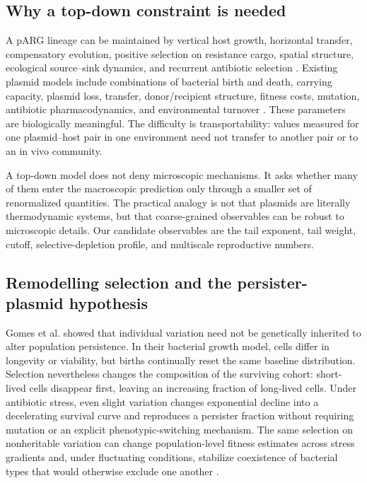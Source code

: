 \documentclass[12pt,a4paper]{article}
\begin{document}
\subsection{Why a top-down constraint is needed}

A pARG lineage can be maintained by vertical host growth, horizontal transfer, compensatory evolution, positive selection on resistance cargo, spatial structure, ecological source--sink dynamics, and recurrent antibiotic selection \citep{harrison2012,brockhurst2022,rodriguezbeltran2021}. Existing plasmid models include combinations of bacterial birth and death, carrying capacity, plasmid loss, transfer, donor/recipient structure, fitness costs, mutation, antibiotic pharmacodynamics, and environmental turnover \citep{hernandez2021,dewan2023,zwanzig2021}. These parameters are biologically meaningful. The difficulty is transportability: values measured for one plasmid--host pair in one environment need not transfer to another pair or to an in vivo community.

A top-down model does not deny microscopic mechanisms. It asks whether many of them enter the macroscopic prediction only through a smaller set of renormalized quantities. The practical analogy is not that plasmids are literally thermodynamic systems, but that coarse-grained observables can be robust to microscopic details. Our candidate observables are the tail exponent, tail weight, cutoff, selective-depletion profile, and multiscale reproductive numbers.

\subsection{Remodelling selection and the persister-plasmid hypothesis}

Gomes et al. showed that individual variation need not be genetically inherited to alter population persistence. In their bacterial growth model, cells differ in longevity or viability, but births continually reset the same baseline distribution. Selection nevertheless changes the composition of the surviving cohort: short-lived cells disappear first, leaving an increasing fraction of long-lived cells. Under antibiotic stress, even slight variation changes exponential decline into a decelerating survival curve and reproduces a persister fraction without requiring mutation or an explicit phenotypic-switching mechanism. The same selection on nonheritable variation can change population-level fitness estimates across stress gradients and, under fluctuating conditions, stabilize coexistence of bacterial types that would otherwise exclude one another \citep{gomes2019variation}.
\end{document}
